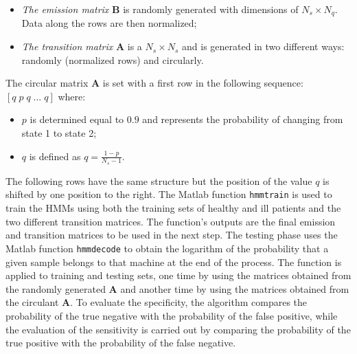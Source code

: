 \documentclass[12pt]{article}
\begin{document}
\begin{itemize}[noitemsep]
\item \textit{The emission matrix} \textbf{B} is randomly generated with dimensions of $N_{s}\times N_{q}$. Data along the rows are then normalized; 
\item \textit{The transition matrix} \textbf{A} is a $N_{s}\times N_{s}$ and is generated in two different ways: randomly (normalized rows) and circularly. 
\end{itemize}
The circular matrix \textbf{A} is set with a first row in the following sequence: $[q \; p \; q \; ... \; q]$ where:  
\begin{itemize}[noitemsep]
\item $p$ is determined equal to $0.9$ and represents the probability of changing from state 1 to state 2;
\item $q$ is defined as $q=\frac{1-p}{N_{s}-1}$.
\end{itemize}
The following rows have the same structure but the position of the value $q$ is shifted by one position to the right. The Matlab function \texttt{hmmtrain} is used to train the HMMs using both the training sets of healthy and ill patients and the two different transition matrices. The function's outputs are the final emission and transition matrices to be used in the next step. The testing phase uses the Matlab function \texttt{hmmdecode} to obtain the logarithm of the probability that a given sample belongs to that machine at the end of the process. The function is applied to training and testing sets, one time by using the matrices obtained from the randomly generated \textbf{A} and another time by using the matrices obtained from the circulant \textbf{A}. To evaluate the specificity, the algorithm compares the probability of the true negative with the probability of the false positive, while the evaluation of the sensitivity is carried out by comparing the probability of the true positive with the probability of the false negative.
\end{document}
